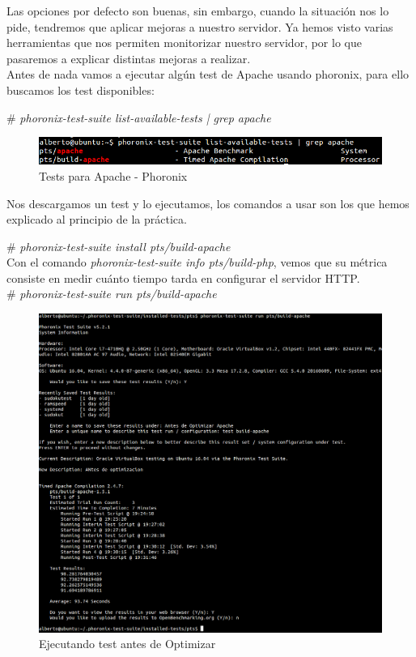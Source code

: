 Las opciones por defecto son buenas, sin embargo, cuando la situación nos lo pide, tendremos que aplicar mejoras a nuestro servidor. Ya hemos visto varias herramientas que nos permiten monitorizar nuestro servidor, por lo que pasaremos a explicar distintas mejoras a realizar. \\
Antes de nada vamos a ejecutar algún test de Apache usando phoronix, para ello buscamos los test disponibles:

\# \textit{phoronix-test-suite list-available-tests | grep apache} \\

\begin{figure}[h]
	\centering
	\includegraphics[scale=0.35]{images/apache122.png}
	\caption{Tests para Apache - Phoronix}
\end{figure}

\newpage
Nos descargamos un test y lo ejecutamos, los comandos a usar son los que hemos explicado al principio de la práctica.

\# \textit{phoronix-test-suite install pts/build-apache} \\

Con el comando 
\textit{phoronix-test-suite info  pts/build-php}, vemos que su métrica consiste en medir cuánto tiempo tarda en configurar el servidor HTTP. \\
\# \textit{phoronix-test-suite run pts/build-apache} \\


\begin{figure}[h]
	\centering
	\includegraphics[scale=0.39]{images/antesOP.png}
	\caption{Ejecutando test antes de Optimizar}
\end{figure}


